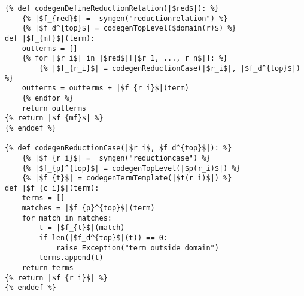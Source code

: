\begin{verbatim}
{% def codegenDefineReductionRelation(|$red$|): %}
	{% |$f_{red}$| =  symgen("reductionrelation") %}
	{% |$f_d^{top}$| = codegenTopLevel($domain(r)$) %}
def |$f_{mf}$|(term):
	outterms = []
	{% for |$r_i$| in |$red$|[|$r_1, ..., r_n$|]: %}
		{% |$f_{r_i}$| = codegenReductionCase(|$r_i$|, |$f_d^{top}$|) %}
	outterms = outterms + |$f_{r_i}$|(term)
	{% endfor %}
	return outterms
{% return |$f_{mf}$| %}
{% enddef %}

{% def codegenReductionCase(|$r_i$, $f_d^{top}$|): %}
	{% |$f_{r_i}$| =  symgen("reductioncase") %}
	{% |$f_{p}^{top}$| = codegenTopLevel(|$p(r_i)$|) %}
	{% |$f_{t}$| = codegenTermTemplate(|$t(r_i)$|) %}
def |$f_{c_i}$|(term):
	terms = []
	matches = |$f_{p}^{top}$|(term)
	for match in matches:
		t = |$f_{t}$|(match)
		if len(|$f_d^{top}$|(t)) == 0:
			raise Exception("term outside domain")
		terms.append(t)
	return terms
{% return |$f_{r_i}$| %}
{% enddef %}
\end{verbatim}
